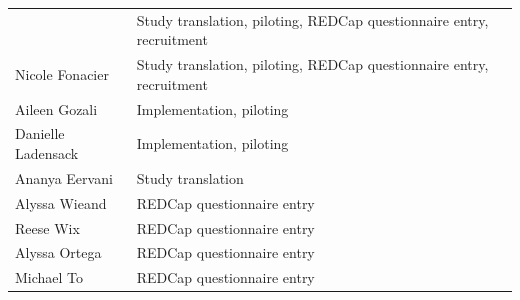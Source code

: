 \documentclass[]{book}
\begin{document}
\begin{longtable}[]{@{}ll@{}}
\begin{minipage}[t]{0.22\columnwidth}
\end{minipage} & \begin{minipage}[t]{0.72\columnwidth}\raggedright
Study translation, piloting, REDCap questionnaire entry, recruitment\strut
\end{minipage}\tabularnewline
\begin{minipage}[t]{0.22\columnwidth}\raggedright
Nicole Fonacier\strut
\end{minipage} & \begin{minipage}[t]{0.72\columnwidth}\raggedright
Study translation, piloting, REDCap questionnaire entry, recruitment\strut
\end{minipage}\tabularnewline
\begin{minipage}[t]{0.22\columnwidth}\raggedright
Aileen Gozali\strut
\end{minipage} & \begin{minipage}[t]{0.72\columnwidth}\raggedright
Implementation, piloting\strut
\end{minipage}\tabularnewline
\begin{minipage}[t]{0.22\columnwidth}\raggedright
Danielle Ladensack\strut
\end{minipage} & \begin{minipage}[t]{0.72\columnwidth}\raggedright
Implementation, piloting\strut
\end{minipage}\tabularnewline
\begin{minipage}[t]{0.22\columnwidth}\raggedright
Ananya Eervani\strut
\end{minipage} & \begin{minipage}[t]{0.72\columnwidth}\raggedright
Study translation\strut
\end{minipage}\tabularnewline
\begin{minipage}[t]{0.22\columnwidth}\raggedright
Alyssa Wieand\strut
\end{minipage} & \begin{minipage}[t]{0.72\columnwidth}\raggedright
REDCap questionnaire entry\strut
\end{minipage}\tabularnewline
\begin{minipage}[t]{0.22\columnwidth}\raggedright
Reese Wix\strut
\end{minipage} & \begin{minipage}[t]{0.72\columnwidth}\raggedright
REDCap questionnaire entry\strut
\end{minipage}\tabularnewline
\begin{minipage}[t]{0.22\columnwidth}\raggedright
Alyssa Ortega\strut
\end{minipage} & \begin{minipage}[t]{0.72\columnwidth}\raggedright
REDCap questionnaire entry\strut
\end{minipage}\tabularnewline
\begin{minipage}[t]{0.22\columnwidth}\raggedright
Michael To\strut
\end{minipage} & \begin{minipage}[t]{0.72\columnwidth}\raggedright
REDCap questionnaire entry\strut
\end{minipage}\tabularnewline
\bottomrule
\end{longtable}
\end{document}
